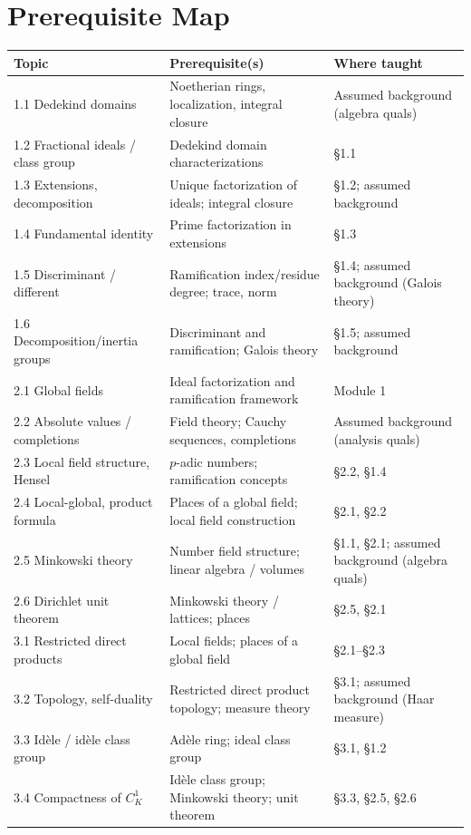 \documentclass[11pt]{article}
\begin{document}
\section{Prerequisite Map}
\begin{longtable}{p{3.6cm} p{6.2cm} p{4.4cm}}
\toprule
\textbf{Topic} & \textbf{Prerequisite(s)} & \textbf{Where taught} \\
\midrule
\endhead
1.1 Dedekind domains & Noetherian rings, localization, integral closure & Assumed background (algebra quals) \\
1.2 Fractional ideals / class group & Dedekind domain characterizations & \S1.1 \\
1.3 Extensions, decomposition & Unique factorization of ideals; integral closure & \S1.2; assumed background \\
1.4 Fundamental identity & Prime factorization in extensions & \S1.3 \\
1.5 Discriminant / different & Ramification index/residue degree; trace, norm & \S1.4; assumed background (Galois theory) \\
1.6 Decomposition/inertia groups & Discriminant and ramification; Galois theory & \S1.5; assumed background \\
2.1 Global fields & Ideal factorization and ramification framework & Module 1 \\
2.2 Absolute values / completions & Field theory; Cauchy sequences, completions & Assumed background (analysis quals) \\
2.3 Local field structure, Hensel & $p$-adic numbers; ramification concepts & \S2.2, \S1.4 \\
2.4 Local-global, product formula & Places of a global field; local field construction & \S2.1, \S2.2 \\
2.5 Minkowski theory & Number field structure; linear algebra / volumes & \S1.1, \S2.1; assumed background (algebra quals) \\
2.6 Dirichlet unit theorem & Minkowski theory / lattices; places & \S2.5, \S2.1 \\
3.1 Restricted direct products & Local fields; places of a global field & \S2.1--\S2.3 \\
3.2 Topology, self-duality & Restricted direct product topology; measure theory & \S3.1; assumed background (Haar measure) \\
3.3 Idèle / idèle class group & Adèle ring; ideal class group & \S3.1, \S1.2 \\
3.4 Compactness of $C_K^1$ & Idèle class group; Minkowski theory; unit theorem & \S3.3, \S2.5, \S2.6 \\

\end{longtable}
\end{document}
